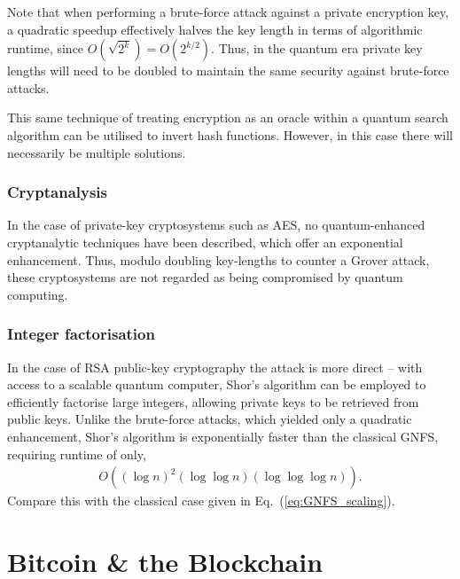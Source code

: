 Note that when performing a brute-force attack against a private encryption key, a quadratic speedup effectively halves the key length in terms of algorithmic runtime, since \mbox{$O(\sqrt{2^k}) = O(2^{k/2})$}. Thus, in the quantum era private key lengths will need to be doubled to maintain the same security against brute-force attacks.

This same technique of treating encryption as an oracle within a quantum search algorithm can be utilised to invert hash functions. However, in this case there will necessarily be multiple solutions.

%
%

\subsubsection{Cryptanalysis}

In the case of private-key cryptosystems such as AES, no quantum-enhanced cryptanalytic techniques have been described, which offer an exponential enhancement. Thus, modulo doubling key-lengths to counter a Grover attack, these cryptosystems are not regarded as being compromised by quantum computing.

%
%

\subsubsection{Integer factorisation}

In the case of RSA public-key cryptography the attack is more direct -- with access to a scalable quantum computer, Shor's algorithm can be employed to efficiently factorise large integers, allowing private keys to be retrieved from public keys. Unlike the brute-force attacks, which yielded only a quadratic enhancement, Shor's algorithm is exponentially faster than the classical GNFS, requiring runtime of only,
\begin{align}
	O((\log n)^2(\log\log n)(\log\log\log n)).
\end{align}
Compare this with the classical case given in Eq.~(\ref{eq:GNFS_scaling}).

%
%

\section{Bitcoin \& the Blockchain}\label{sec:bitcoin_blockchain}

